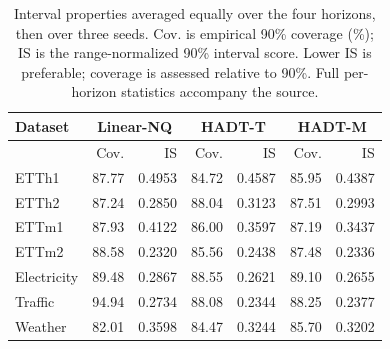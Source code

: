 \begin{table}[t]
\centering\small
\caption{Interval properties averaged equally over the four horizons, then over three seeds. Cov. is empirical 90\% coverage (\%); IS is the range-normalized 90\% interval score. Lower IS is preferable; coverage is assessed relative to 90\%. Full per-horizon statistics accompany the source.}
\label{tab:intervals}
\begin{tabular}{@{}lrrrrrr@{}}
\toprule
Dataset & \multicolumn{2}{c}{Linear-NQ} & \multicolumn{2}{c}{HADT-T} & \multicolumn{2}{c}{HADT-M} \\
\midrule
 & Cov. & IS & Cov. & IS & Cov. & IS \\
\midrule
ETTh1 & 87.77 & 0.4953 & 84.72 & 0.4587 & 85.95 & 0.4387 \\
ETTh2 & 87.24 & 0.2850 & 88.04 & 0.3123 & 87.51 & 0.2993 \\
ETTm1 & 87.93 & 0.4122 & 86.00 & 0.3597 & 87.19 & 0.3437 \\
ETTm2 & 88.58 & 0.2320 & 85.56 & 0.2438 & 87.48 & 0.2336 \\
Electricity & 89.48 & 0.2867 & 88.55 & 0.2621 & 89.10 & 0.2655 \\
Traffic & 94.94 & 0.2734 & 88.08 & 0.2344 & 88.25 & 0.2377 \\
Weather & 82.01 & 0.3598 & 84.47 & 0.3244 & 85.70 & 0.3202 \\
\bottomrule
\end{tabular}
\end{table}
